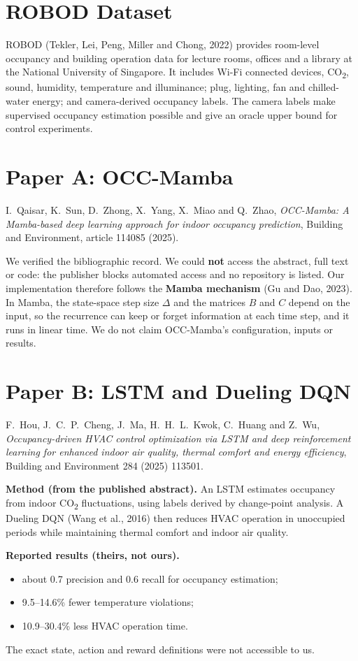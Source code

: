 \documentclass[12pt,a4paper,oneside]{report}
\newcommand{\COtwo}{CO\textsubscript{2}}
\begin{document}
\section{ROBOD Dataset}
ROBOD (Tekler, Lei, Peng, Miller and Chong, 2022) provides room-level occupancy and building operation data for
lecture rooms, offices and a library at the National University of Singapore. It includes Wi-Fi connected devices,
\COtwo{}, sound, humidity, temperature and illuminance; plug, lighting, fan and chilled-water energy; and
camera-derived occupancy labels. The camera labels make supervised occupancy estimation possible and give an oracle
upper bound for control experiments.

\section{Paper A: OCC-Mamba}
I.~Qaisar, K.~Sun, D.~Zhong, X.~Yang, X.~Miao and Q.~Zhao, \emph{OCC-Mamba: A Mamba-based deep learning approach for
indoor occupancy prediction}, Building and Environment, article 114085 (2025).

We verified the bibliographic record. We could \textbf{not} access the abstract, full text or code: the publisher
blocks automated access and no repository is listed. Our implementation therefore follows the \textbf{Mamba
mechanism} (Gu and Dao, 2023). In Mamba, the state-space step size $\Delta$ and the matrices $B$ and $C$ depend on the
input, so the recurrence can keep or forget information at each time step, and it runs in linear time. We do not
claim OCC-Mamba's configuration, inputs or results.

\section{Paper B: LSTM and Dueling DQN}
F.~Hou, J.~C.~P.~Cheng, J.~Ma, H.~H.~L.~Kwok, C.~Huang and Z.~Wu, \emph{Occupancy-driven HVAC control optimization
via LSTM and deep reinforcement learning for enhanced indoor air quality, thermal comfort and energy efficiency},
Building and Environment 284 (2025) 113501.

\textbf{Method (from the published abstract).} An LSTM estimates occupancy from indoor \COtwo{} fluctuations, using
labels derived by change-point analysis. A Dueling DQN (Wang et al., 2016) then reduces HVAC operation in unoccupied
periods while maintaining thermal comfort and indoor air quality.

\textbf{Reported results (theirs, not ours).}
\begin{itemize}
\item about 0.7 precision and 0.6 recall for occupancy estimation;
\item 9.5--14.6\% fewer temperature violations;
\item 10.9--30.4\% less HVAC operation time.
\end{itemize}
The exact state, action and reward definitions were not accessible to us.
\end{document}
